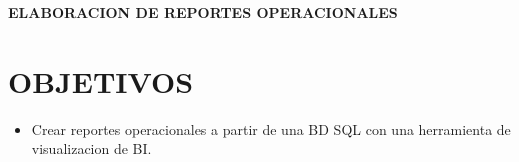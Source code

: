 \documentclass[12pt,letterpaper]{article}
\begin{document}
    \newpage
    \begin{LARGE}
        \begin{center}
            \textbf{ELABORACION DE REPORTES OPERACIONALES}\\
        \end{center}
    \end{LARGE}
    \section{OBJETIVOS}
    \begin{itemize}
        \item Crear reportes operacionales a partir de una BD SQL con una herramienta de visualizacion de BI.
    \end{itemize}
\end{document}
